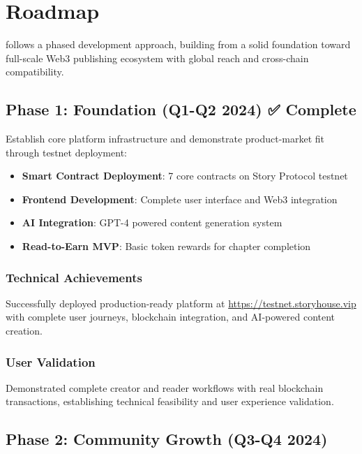 \section{Roadmap}
\label{sec:roadmap}

\storyhouse{} follows a phased development approach, building from a solid foundation toward full-scale Web3 publishing ecosystem with global reach and cross-chain compatibility.

\subsection{Phase 1: Foundation (Q1-Q2 2024) ✅ Complete}

Establish core platform infrastructure and demonstrate product-market fit through testnet deployment:

\begin{itemize}
    \item \textbf{Smart Contract Deployment}: 7 core contracts on Story Protocol testnet
    \item \textbf{Frontend Development}: Complete user interface and Web3 integration
    \item \textbf{AI Integration}: GPT-4 powered content generation system
    \item \textbf{Read-to-Earn MVP}: Basic token rewards for chapter completion
\end{itemize}

\subsubsection{Technical Achievements}

Successfully deployed production-ready platform at \url{https://testnet.storyhouse.vip} with complete user journeys, blockchain integration, and AI-powered content creation.

\subsubsection{User Validation}

Demonstrated complete creator and reader workflows with real blockchain transactions, establishing technical feasibility and user experience validation.

\subsection{Phase 2: Community Growth (Q3-Q4 2024)}

